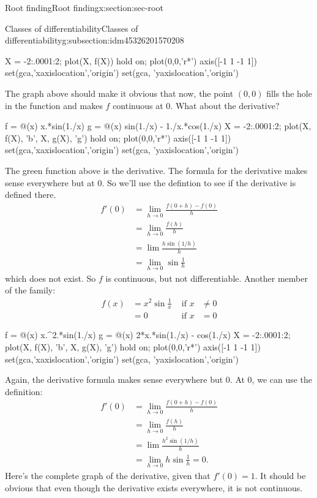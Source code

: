 \documentclass[oneside,10pt,]{article}
\numberwithin{equation}{section}
\numberwithin{equation}{section}
\newcommand{\amp}{&}
\begin{document}
\begin{sectionptx}{Root finding}{}{Root finding}{}{}{x:section:sec-root}
\begin{subsectionptx}{Classes of differentiability}{}{Classes of differentiability}{}{}{g:subsection:idm45326201570208}
\begin{sageinput}
X = -2:.0001:2;
plot(X, f(X))
hold on;
plot(0,0,'r*')
axis([-1 1 -1 1])
set(gca,'xaxislocation','origin')
set(gca, 'yaxislocation','origin')
\end{sageinput}
The graph above should make it obvious that now, the point \((0,0)\) fills the hole in the function and makes \(f\) continuous at \(0\). What about the derivative?%
\begin{sageinput}
f = @(x) x.*sin(1./x)
g = @(x) sin(1./x) - 1./x.*cos(1./x)
X = -2:.0001:2;
plot(X, f(X), 'b', X, g(X), 'g')
hold on;
plot(0,0,'r*')
axis([-1 1 -1 1])
set(gca,'xaxislocation','origin')
set(gca, 'yaxislocation','origin')
\end{sageinput}
The green function above is the derivative. The formula for the derivative makes sense everywhere but at 0. So we'll use the defintion to see if the derivative is defined there.%
\begin{align*}
f'(0) \amp= \lim_{h \to 0} \frac{f(0+h) - f(0)}{h}\\
\amp= \lim_{h \to 0} \frac{f(h)}{h}\\
\amp= \lim \frac{h \sin(1/h)}{h} \\
\amp= \lim_{h \to 0} \sin \frac{1}{h}
\end{align*}
which does not exist. So \(f\) is continuous, but not differentiable. Another member of the family:%
%
\begin{align*}
f(x) \amp= x^2 \sin \frac{1}{x} \amp\text{ if } x \amp\neq 0 \\
\amp = 0 \amp\text{ if } x \amp= 0
\end{align*}
\begin{sageinput}
f = @(x) x.^2.*sin(1./x)
g = @(x) 2*x.*sin(1./x) - cos(1./x)
X = -2:.0001:2;
plot(X, f(X), 'b', X, g(X), 'g')
hold on;
plot(0,0,'r*')
axis([-1 1 -1 1])
set(gca,'xaxislocation','origin')
set(gca, 'yaxislocation','origin')
\end{sageinput}
Again, the derivative formula makes sense everywhere but 0. At 0, we can use the definition:%
%
\begin{align*}
f'(0) \amp= \lim_{h \to 0} \frac{f(0+h) - f(0)}{h}\\
\amp= \lim_{h \to 0} \frac{f(h)}{h}\\
\amp= \lim \frac{h^2 \sin(1/h)}{h} \\
\amp= \lim_{h \to 0} h \sin \frac{1}{h} = 0.
\end{align*}
Here's the complete graph of the derivative, given that \(f'(0) = 1\). It should be obvious that even though the derivative exists everywhere, it is not continuous.%

\end{subsectionptx}
\end{sectionptx}
\end{document}
